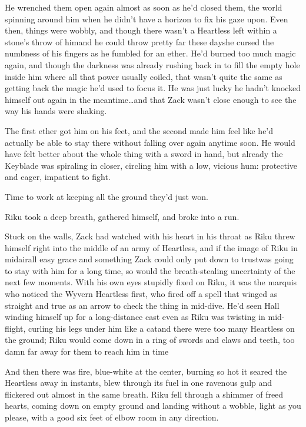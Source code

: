 He wrenched them open again almost as soon as he'd closed them, the world spinning around him when he didn't have a horizon to fix his gaze upon. Even then, things were wobbly, and though there wasn't a Heartless left within a stone's throw of him\textemdash and he could throw pretty far these days\textemdash he cursed the numbness of his fingers as he fumbled for an ether. He'd burned too much magic again, and though the darkness was already rushing back in to fill the empty hole inside him where all that power usually coiled, that wasn't quite the same as getting back the magic he'd used to focus it. He was just lucky he hadn't knocked himself out again in the meantime\ldots and that Zack wasn't close enough to see the way his hands were shaking.

The first ether got him on his feet, and the second made him feel like he'd actually be able to stay there without falling over again anytime soon. He would have felt better about the whole thing with a sword in hand, but already the Keyblade was spiraling in closer, circling him with a low, vicious hum: protective and eager, impatient to fight.

Time to work at keeping all the ground they'd just won.

Riku took a deep breath, gathered himself, and broke into a run.


\scenechange


Stuck on the walls, Zack had watched with his heart in his throat as Riku threw himself right into the middle of an army of Heartless, and if the image of Riku in midair\textemdash all easy grace and something Zack could only put down to trust\textemdash was going to stay with him for a long time, so would the breath-stealing uncertainty of the next few moments. With his own eyes stupidly fixed on Riku, it was the marquis who noticed the Wyvern Heartless first, who fired off a spell that winged as straight and true as an arrow to check the thing in mid-dive. He'd seen Hall winding himself up for a long-distance cast even as Riku was twisting in mid-flight, curling his legs under him like a cat\textemdash and there were too many Heartless on the ground; Riku would come down in a ring of swords and claws and teeth, too damn far away for them to reach him in time\textemdash 

And then there was fire, blue-white at the center, burning so hot it seared the Heartless away in instants, blew through its fuel in one ravenous gulp and flickered out almost in the same breath. Riku fell through a shimmer of freed hearts, coming down on empty ground and landing without a wobble, light as you please, with a good six feet of elbow room in any direction.

